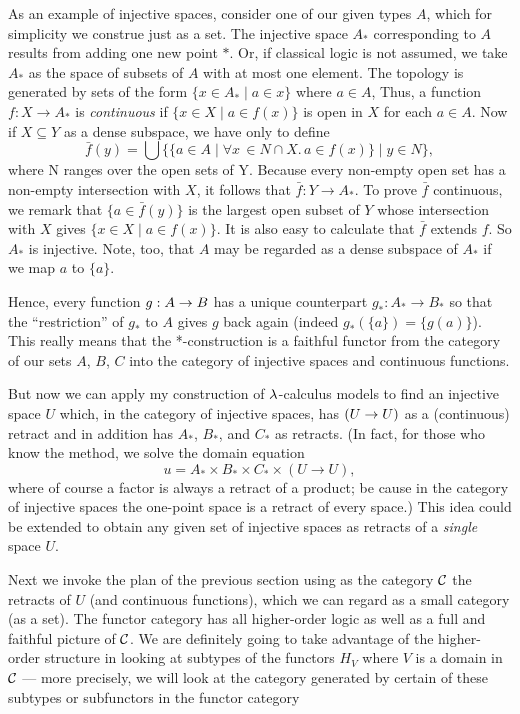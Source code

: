 As an example of injective spaces, consider one of our given types $A$, which for
simplicity we construe just as a set. The injective space $A_*$ corresponding to $A$
results from adding one new point $*$. Or, if classical logic is not assumed, we take
$A_*$ as the space of subsets of $A$ with at most one element. The topology is generated
by sets of the form $\{x \in A_* \mid  a \in x\}$ where $a \in A$, Thus, a function $f : X
\to A_*$ is {\it continuous} if $\{x \in X \mid a \in f(x)\}$ is open in $X$ for each $a
\in A$. Now if $X \subseteq Y$ as a dense subspace, we have only to define
$$
\bar{f}(y) = \bigcup \bigl\{\{a \in A \mid \forall x\, \in N \cap X.\, a \in f(x)\} \mid y \in N\bigr \},
$$
where N ranges over the open sets of Y. Because every non-empty open set has a non-empty
intersection with $X$, it follows that $\bar{f} : Y \to A_*$. To prove $\bar{f}$
continuous, we remark that $\{a \in \bar{f}(y)\}$ is the largest open subset of $Y$ whose
intersection with $X$ gives $\{x \in X \mid a \in f(x)\}$. It is also easy to calculate
that $\bar{f}$ extends $f$. So $A_*$ is injective. Note, too, that $A$ may be regarded as
a dense subspace of $A_*$ if we map $a$ to $\{a\}$.

Hence, every function $g:A \rightarrow B$ has a unique counterpart $g_* : A_*\to B_*$ so that the
``restriction'' of $g_*$ to $A$ gives $g$ back again (indeed $g_*(\{a\}) = \{g(a)\}$).
This really means that the *-construction is a faithful functor from the category of our
sets $A$, $B$, $C$ into the category of injective spaces and continuous functions.

But now we can apply my construction of $\lambda$-calculus models to find an injective space
$U$ which, in the category of injective spaces, has $(U\rightarrow U)$ as a (continuous) retract and in
addition has $A_*$, $B_*$, and $C_*$ as retracts. (In fact, for those who know the method,
we solve the domain equation
$$
u = A_* \times B_* \times C_* \times (U \to U),
$$
where of course a factor is always a retract of a product; be cause in the category of
injective spaces the one-point space is a retract of every space.) This idea could be
extended to obtain any given set of injective spaces as retracts of a {\it single} space
$U$.

Next we invoke the plan of the previous section using as the category $\mathcal C$ the retracts of
$U$ (and continuous functions), which we can regard as a small category (as a set). The
functor category has all higher-order logic as well as a full and faithful picture of
$\mathcal C$. We are definitely going to take advantage of the higher-order structure in looking
at subtypes of the functors $H_V$ where $V$ is a domain in $\mathcal C$ --- more precisely, we
will look at the category generated by certain of these subtypes or subfunctors in the
functor category

